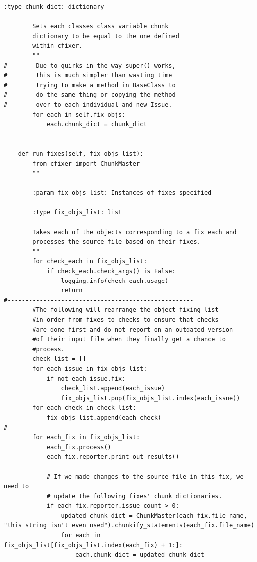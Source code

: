 \documentclass[11pt]{scrreprt}
\begin{document}
\begin{lstlisting}[frame=single,basicstyle=\small]
        :type chunk_dict: dictionary
        
        Sets each classes class variable chunk
        dictionary to be equal to the one defined
        within cfixer.
        ""
#        Due to quirks in the way super() works, 
#        this is much simpler than wasting time
#        trying to make a method in BaseClass to
#        do the same thing or copying the method 
#        over to each individual and new Issue.
        for each in self.fix_objs:
            each.chunk_dict = chunk_dict


    def run_fixes(self, fix_objs_list):
        from cfixer import ChunkMaster
        ""
        
        :param fix_objs_list: Instances of fixes specified
        
        :type fix_objs_list: list
        
        Takes each of the objects corresponding to a fix each and
        processes the source file based on their fixes.
        ""
        for check_each in fix_objs_list:
            if check_each.check_args() is False:
                logging.info(check_each.usage)
                return
#----------------------------------------------------
        #The following will rearrange the object fixing list
        #in order from fixes to checks to ensure that checks
        #are done first and do not report on an outdated version
        #of their input file when they finally get a chance to 
        #process.
        check_list = []
        for each_issue in fix_objs_list:
            if not each_issue.fix:
                check_list.append(each_issue)
                fix_objs_list.pop(fix_objs_list.index(each_issue))
        for each_check in check_list:
            fix_objs_list.append(each_check)
#------------------------------------------------------
        for each_fix in fix_objs_list:
            each_fix.process()
            each_fix.reporter.print_out_results()

            # If we made changes to the source file in this fix, we need to
            # update the following fixes' chunk dictionaries.
            if each_fix.reporter.issue_count > 0:
                updated_chunk_dict = ChunkMaster(each_fix.file_name, "this string isn't even used").chunkify_statements(each_fix.file_name)
                for each in fix_objs_list[fix_objs_list.index(each_fix) + 1:]:
                    each.chunk_dict = updated_chunk_dict

\end{lstlisting}
\end{document}
